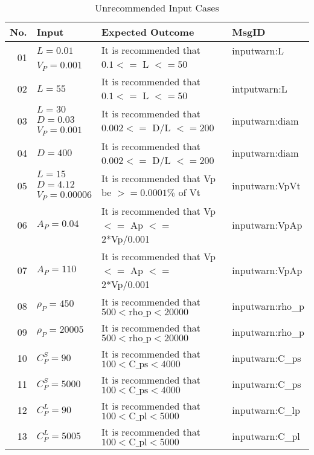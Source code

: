 \documentclass[12pt]{article}
\begin{document}
\begin{center}
	\begin{longtable}{ | r | p{3cm} | p{5cm} | p{4cm} |}
	\caption{Unrecommended Input Cases} \\ \hline \label{TblUnrecommendedInput} 
	No. & Input & Expected Outcome & MsgID \\ \hline
	\multirow{2}{*}{01} & $L = 0.01$ & \multirow{2}{*}{\parbox{5cm}{It is recommended that $0.1 <=$ L $<= 50$}}& inputwarn:L\\ 
	& $V_P = 0.001$ & & \\ \hline
	02 & $L = 55$ & It is recommended that $0.1 <=$ L $<= 50$ & intputwarn:L\\ \hline
    \multirow{3}{*}{03} & $L = 30$ & \multirow{3}{*}{\parbox{5cm}{It is recommended that $0.002 <=$ D/L $<= 200$}} & \multirow{3}{*}{inputwarn:diam} \\
    & $D = 0.03$ & & \\
    & $V_P = 0.001$ & & \\ \hline
	04 & $D = 400$ & It is recommended that $0.002 <=$ D/L $<= 200$ & inputwarn:diam\\ \hline
	\multirow{3}{*}{05} & $L = 15$ & \multirow{3}{*}{\parbox{5cm}{It is recommended that Vp be $>= 0.0001\%$ of Vt}} & \multirow{3}{*}{inputwarn:VpVt}\\ 
	& $D = 4.12$ & & \\
	& $V_P = 0.00006$ & & \\ \hline
	06 & $A_P = 0.04$ & It is recommended that Vp $<=$ Ap $<=$ 2*Vp/0.001 & inputwarn:VpAp \\ \hline
	07 & $A_P = 110$ & It is recommended that Vp $<=$ Ap $<=$ 2*Vp/0.001 & inputwarn:VpAp \\ \hline
	08 & $\rho_P = 450$ & It is recommended that $500 < \text{rho\_{p}} < 20000$ &inputwarn:rho\_{p} \\ \hline
	09 & $\rho_P = 20005$ & It is recommended that $500 < \text{rho\_{p}} < 20000$ & inputwarn:rho\_{p}\\ \hline
	10 & $C^S_P = 90$ & It is recommended that $100 < \text{C\_{ps}} < 4000$ & inputwarn:C\_{ps}\\ \hline
	11 & $C^S_P = 5000$ & It is recommended that $100 < \text{C\_{ps}} < 4000$ & inputwarn:C\_{ps}\\ \hline
	12 & $C^L_P = 90$ & It is recommended that $100 < \text{C\_{pl}} < 5000$ & inputwarn:C\_{lp} \\ \hline
	13 & $C^L_P = 5005$ & It is recommended that $100 < \text{C\_{pl}} < 5000$ & inputwarn:C\_{pl} \\ \hline

\end{longtable}
\end{center}
\end{document}
